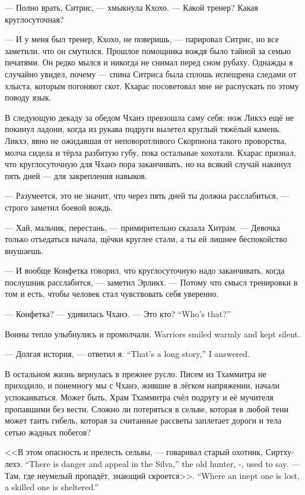 --- Полно врать, Ситрис, --- хмыкнула Кхохо.
--- Какой тренер?
Какая круглосуточная?

--- И у меня был тренер, Кхохо, не поверишь, --- парировал Ситрис, но все заметили, что он смутился.
Прошлое помощника вождя было тайной за семью печатями.
Он редко мылся и никогда не снимал перед сном рубаху.
Однажды я случайно увидел, почему --- спина Ситриса была сплошь испещрена следами от хлыста, которым погоняют скот.
Кхарас посоветовал мне не распускать по этому поводу язык.

В следующую декаду за обедом Чханэ превзошла саму себя: нож Ликхэ ещё не покинул ладони, когда из рукава подруги вылетел круглый тяжёлый камень.
Ликхэ, явно не ожидавшая от неповоротливого Скорпиона такого проворства, молча сидела и тёрла разбитую губу, пока остальные хохотали.
Кхарас признал, что круглосуточную для Чханэ пора заканчивать, но на всякий случай накинул пять дней --- для закрепления навыков.

--- Разумеется, это не значит, что через пять дней ты должна расслабиться, --- строго заметил боевой вождь.

--- Хай, мальчик, перестань, --- примирительно сказала Хитрам.
--- Девочка только отъедаться начала, щёчки круглее стали, а ты ей лишнее беспокойство внушаешь.

--- И вообще Конфетка говорил, что круглосуточную надо заканчивать, когда послушник расслабится, --- заметил Эрликх.
--- Потому что смысл тренировки в том и есть, чтобы человек стал чувствовать себя уверенно.

--- Конфетка? --- удивилась Чханэ.
{--- Это кто?}
{``Who's that?''}

{Воины тепло улыбнулись и промолчали.}
{Warriors smiled warmly and kept silent.}

{--- Долгая история, --- ответил я.}
{``That's a long story,'' I answered.}

В остальном жизнь вернулась в прежнее русло.
Писем из Тхаммитра не приходило, и понемногу мы с Чханэ, жившие в лёгком напряжении, начали успокаиваться.
Может быть, Храм Тхаммитра счёл подругу и её мучителя пропавшими без вести.
Сложно ли потеряться в сельве, которая в любой тени может таить гибель, которая за считанные рассветы заплетает дороги и тела сетью жадных побегов?

{<<В этом опасность и прелесть сельвы, --- говаривал старый охотник, Сиртху-лехэ.}
{``There is danger and appeal in the Silva,'' the old hunter, \Sirtchu-\lechoe, used to say.}
{--- Там, где неумелый пропадёт, знающий скроется>>.}
{``Where an inept one is lost, a skilled one is sheltered.''}

